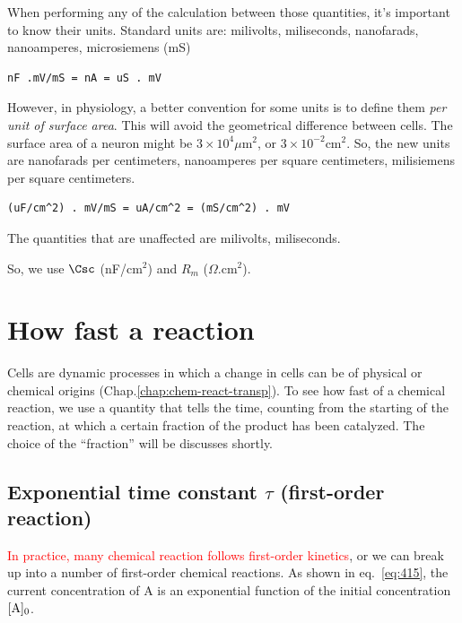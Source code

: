 When performing any of the calculation between those quantities, it's
important to know their units.  Standard units are: milivolts,
miliseconds, nanofarads, nanoamperes, microsiemens (mS)
\begin{verbatim}
nF .mV/mS = nA = uS . mV
\end{verbatim}


However, in physiology, a better convention for some units is to
define them {\it per unit of surface area}. This will avoid the
geometrical difference between cells. The surface area of a neuron
might be $3\times 10^4 \mu$m$^2$, or $3\times 10^{-2}$cm$^2$.  So, the
new units are nanofarads per centimeters, nanoamperes per square
centimeters, milisiemens per square centimeters.
\begin{verbatim}
(uF/cm^2) . mV/mS = uA/cm^2 = (mS/cm^2) . mV
\end{verbatim}
The quantities that are unaffected are milivolts, miliseconds. 

So, we use $\Csc$ (nF/cm$^2$) and $R_m$ ($\Omega$.cm$^2$).

\section{How fast a reaction}
\label{sec:how-fast-reaction}

Cells are dynamic processes in which a change in cells can be of
physical or chemical origins (Chap.\ref{chap:chem-react-transp}).  
To see how fast of a chemical reaction, we use a quantity that tells
the time, counting from the starting of the reaction, at which a
certain fraction of the product has been catalyzed. The choice of the
``fraction'' will be discusses shortly. 

\subsection{Exponential time constant $\tau$ (first-order reaction)}
\label{sec:expon-time-const}

\textcolor{red}{In practice, many chemical reaction follows
  first-order kinetics}, or we can break up into a number of first-order
  chemical reactions.
As shown in eq.~\eqref{eq:415}, the current concentration of A is an
exponential function of the initial concentration $[{\text{A}}]_0$. 

